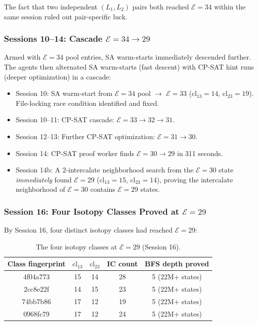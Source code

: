 \documentclass[11pt,a4paper]{article}
\theoremstyle{remark}
\newcommand{\cl}{\mathrm{cl}}
\newcommand{\E}{\mathcal{E}}
\begin{document}
The fact that two independent $(L_1,L_2)$ pairs both reached $\E=34$ within the same
session ruled out pair-specific luck.

\subsubsection{Sessions 10--14: Cascade $\E = 34 \to 29$}

Armed with $\E=34$ pool entries, SA warm-starts immediately descended further. The
agents then alternated SA warm-starts (fast descent) with CP-SAT hint runs (deeper
optimization) in a cascade:

\begin{itemize}[noitemsep]
  \item Session 10: SA warm-start from $\E=34$ pool $\to$ $\E=33$ ($\cl_{13}=14$,
    $\cl_{23}=19$). File-locking race condition identified and fixed.
  \item Session 10--11: CP-SAT cascade: $\E=33 \to 32 \to 31$.
  \item Session 12--13: Further CP-SAT optimization: $\E=31 \to 30$.
  \item Session 14: CP-SAT proof worker finds $\E=30 \to 29$ in 311 seconds.
  \item Session 14b: A 2-intercalate neighborhood search from the $\E=30$ state
    \emph{immediately} found $\E=29$ ($\cl_{13}=15$, $\cl_{23}=14$), proving the
    intercalate neighborhood of $\E=30$ contains $\E=29$ states.
\end{itemize}

\subsubsection{Session 16: Four Isotopy Classes Proved at $\E=29$}

By Session 16, four distinct isotopy classes had reached $\E=29$:

\begin{table}[h]
\centering
\caption{The four isotopy classes at $\E=29$ (Session 16).}\label{tab:e29classes}
\begin{tabular}{ccccc}
\toprule
Class fingerprint & $\cl_{13}$ & $\cl_{23}$ & IC count & BFS depth proved\\
\midrule
4f04a773 & 15 & 14 & 28 & 5 (22M+ states)\\
2cc8e22f & 14 & 15 & 23 & 5 (22M+ states)\\
74bb7b86 & 17 & 12 & 19 & 5 (22M+ states)\\
0968fc79 & 17 & 12 & 24 & 5 (22M+ states)\\
\bottomrule
\end{tabular}
\end{table}
\end{document}
